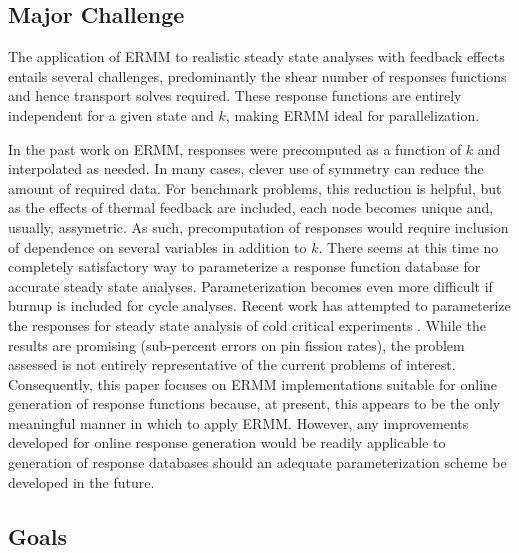 \subsection{Major Challenge}

The application of ERMM to realistic steady state analyses with 
feedback effects entails several challenges, predominantly 
the shear number of responses functions and hence transport solves
required.  These response functions are entirely independent
for a given state and $k$, making ERMM ideal for parallelization.

In the past work on ERMM, responses were precomputed as a function of 
$k$ and interpolated as needed.  In many cases, clever use of symmetry 
can reduce the amount of required data.  For benchmark problems, this
reduction is helpful, but as the effects of thermal feedback are included, 
each node becomes unique and, usually, assymetric.  As such, precomputation 
of responses would require inclusion of dependence on several variables
in addition to $k$.
There seems at this time no completely satisfactory way to parameterize 
a response function database for accurate steady state analyses.  
Parameterization becomes even more difficult if burnup is included 
for cycle analyses. Recent work has attempted to parameterize the 
responses for steady state analysis of cold critical 
experiments \cite{hino2012bwr}.  While the results
are promising (sub-percent errors on pin fission rates), the problem 
assessed is not entirely representative of the current problems of interest.
Consequently, this paper focuses on ERMM implementations suitable for 
online generation of response functions because, at present, this appears 
to be the only meaningful manner in which to apply ERMM.  However, any
improvements developed for online response generation would be readily 
applicable to generation of response databases should an adequate 
parameterization scheme be developed in the future.

\subsection{Goals}


